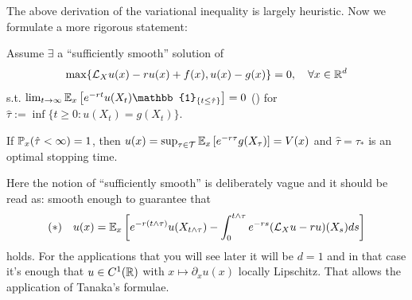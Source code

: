 The above derivation of the variational inequality is largely heuristic. Now we formulate a more rigorous statement:

\begin{theorem}[Verification]
    Assume $\exists$ a ``sufficiently smooth'' solution of
    \begin{equation*}
        \max \{ \mathcal{L}_X u(x) - ru(x) + f(x), u(x) - g(x) \} = 0, \quad \forall x \in \mathbb R^d
    \end{equation*}
    s.t. $\lim_{t \to \infty} \EE_x \left[ e^{-rt} u(X_t) \mathbb{1}_{\{t \leq \hat{\tau}\}} \right] = 0$ () for $\hat{\tau} := \inf \{ t \geq 0 : u(X_t) = g(X_t) \}$.
    
    If $\mathbb P_x(\hat{\tau} < \infty) = 1$, then $u(x) = \sup_{\tau \in \mathcal{T}} \mathbb E_x \left[ e^{-r\tau} g(X_\tau) \right] = V(x)$ and $\hat{\tau} = \tau_*$ is an optimal stopping time.
\end{theorem}

\begin{remark}
    Here the notion of ``sufficiently smooth'' is deliberately vague and it should be read as: smooth enough to guarantee that
    \begin{equation*}
        (*) \quad u(x) = \mathbb E_x \left[ e^{-r(t \wedge \tau)} u(X_{t \wedge \tau}) - \int_0^{t \wedge \tau} e^{-rs} (\mathcal{L}_X u - ru)(X_s) ds \right]
    \end{equation*}
    holds. For the applications that you will see later it will be $d=1$ and in that case it's enough that $u \in C^1(\mathbb R)$ with $x \mapsto \partial_x u(x)$ locally Lipschitz. That allows the application of Tanaka's formulae.
\end{remark}

